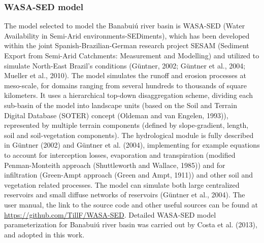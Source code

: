 \documentclass[draft]{agujournal2019}
\begin{document}
\subsubsection{WASA-SED model}
The model selected to model the Banabuiú river basin is WASA-SED (Water Availability in Semi-Arid environments-SEDiments), which has been developed within the joint Spanish-Brazilian-German research project SESAM (Sediment Export from Semi-Arid Catchments: Measurement and Modelling) and utilized to simulate North-East Brazil’s conditions (Güntner, 2002; Güntner et al., 2004; Mueller et al., 2010). The model simulates the runoff and erosion processes at meso-scale, for domains ranging from several hundreds to thousands of square kilometers. It uses a hierarchical top-down disaggregation scheme, dividing each sub-basin of the model into landscape units (based on the Soil and Terrain Digital Database (SOTER) concept (Oldeman and van Engelen, 1993)), represented by multiple terrain components (defined by slope-gradient, length, soil and soil-vegetation components). The hydrological module is fully described in Güntner (2002) and Güntner et al. (2004), implementing for example equations to account for interception losses, evaporation and transpiration (modified Penman-Monteith approach (Shuttleworth and Wallace, 1985)) and for infiltration (Green-Ampt approach (Green and Ampt, 1911)) and other soil and vegetation related processes. The model can simulate both large centralized reservoirs and small diffuse networks of reservoirs (Güntner et al., 2004). The user manual, the link to the source code and other useful sources can be found at \url{https://github.com/TillF/WASA-SED}. Detailed WASA-SED model parameterization for Banabuiú river basin was carried out by Costa et al. (2013), and adopted in this work.
\end{document}
